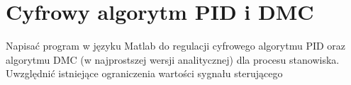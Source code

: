 \section{Cyfrowy algorytm PID i DMC}
Napisać program w języku Matlab do regulacji cyfrowego algorytmu PID oraz algorytmu DMC (w najprostszej wersji analitycznej) dla procesu stanowiska. Uwzględnić
istniejące ograniczenia wartości sygnału sterującego 
